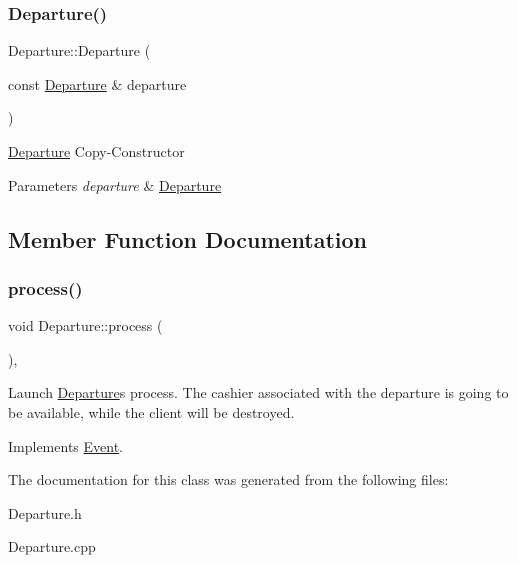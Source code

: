 \subsubsection{\texorpdfstring{Departure()}{Departure()}\hspace{0.1cm}{\footnotesize\ttfamily [2/2]}}
{\footnotesize\ttfamily Departure\+::\+Departure (\begin{DoxyParamCaption}\item[{const \hyperlink{classDeparture}{Departure} \&}]{departure }\end{DoxyParamCaption})}

\hyperlink{classDeparture}{Departure} Copy-\/\+Constructor 
\begin{DoxyParams}{Parameters}
{\em departure} & \hyperlink{classDeparture}{Departure} \\
\hline
\end{DoxyParams}


\subsection{Member Function Documentation}
\mbox{\label{classDeparture_a241611bdf4255d2ba868d58128dddc68}} 
\subsubsection{\texorpdfstring{process()}{process()}}
{\footnotesize\ttfamily void Departure\+::process (\begin{DoxyParamCaption}{ }\end{DoxyParamCaption})\hspace{0.3cm}{\ttfamily [override]}, {\ttfamily [virtual]}}

Launch \hyperlink{classDeparture}{Departure}\textquotesingle{}s process. The cashier associated with the departure is going to be available, while the client will be destroyed. 

Implements \hyperlink{classEvent_af1940e82c4da67c8119f0dfe026949b4}{Event}.



The documentation for this class was generated from the following files\+:\begin{DoxyCompactItemize}
\item 
Departure.\+h\item 
Departure.\+cpp\end{DoxyCompactItemize}
